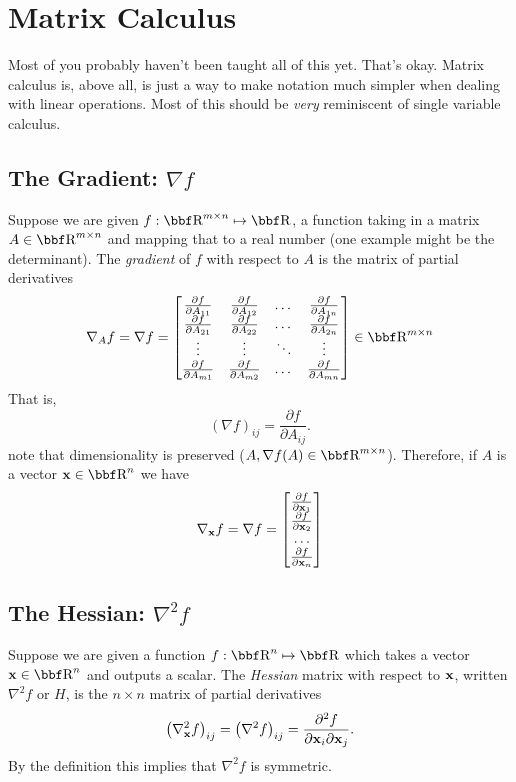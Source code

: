 \documentclass{article}
\begin{document}
\section{Matrix Calculus}

Most of you probably haven't been taught all of this yet. That's okay. Matrix calculus
is, above all, is just a way to make notation much simpler when dealing with
linear operations. Most of this should be \textit{very}
reminiscent of single variable calculus.

\subsection{The Gradient: $\nabla f$}

Suppose we are given $f : \RR^{m\times n} \mapsto \RR$, a function taking in a matrix
$A\in\RR^{m\times n}$ and mapping that to a real number (one example might be the determinant).
The \textit{gradient} of $f$ with respect to $A$ is the matrix of partial derivatives
\[
    \nabla_A f = \nabla f = \m{\frac{\partial f}{\partial A_{11}} & \frac{\partial f}{\partial A_{12}} & \dots & \frac{\partial f}{\partial A_{1n}}\\
    \frac{\partial f}{\partial A_{21}} & \frac{\partial f}{\partial A_{22}} & \dots & \frac{\partial f}{\partial A_{2n}}\\
    \vdots & \vdots & \ddots & \vdots\\
    \frac{\partial f}{\partial A_{m1}} & \frac{\partial f}{\partial A_{m2}} & \dots & \frac{\partial f}{\partial A_{mn}}
    } \in \RR^{m\times n}
\]
That is,
\[
    (\nabla f)_{ij} = \frac{\partial f}{\partial A_{ij}}.
\]
note that dimensionality is preserved ($A,\nabla f(A) \in \RR^{m\times n}$). Therefore,
if $A$ is a vector $\xx\in\RR^n$ we have
\[
    \nabla_{\bf x} f = \nabla f = \begin{bmatrix} \frac{\partial f}{\partial {\bf x}_1} \\ \frac{\partial f}{\partial {\bf x}_2} \\ \dots \\ \frac{\partial f}{\partial {\bf x}_n} \end{bmatrix}
\]

\subsection{The Hessian: $\nabla^2f$}

Suppose we are given a function $f : \RR^n \mapsto \RR$ which takes a vector $\xx\in\RR^n$
and outputs a scalar. The \textit{Hessian} matrix with respect to ${\bf x}$, written $\nabla^2 f$
or $H$, is the $n\times n$ matrix of partial derivatives
\[
    \left(\nabla_{\bf x}^2 f\right)_{ij} = \left( \nabla^2f \right)_{ij} = \frac{\partial^2 f}{\partial {\bf x}_i \partial {\bf x}_j}.
\]
By the definition this implies that $\nabla^2 f$ is symmetric.\\
\end{document}
